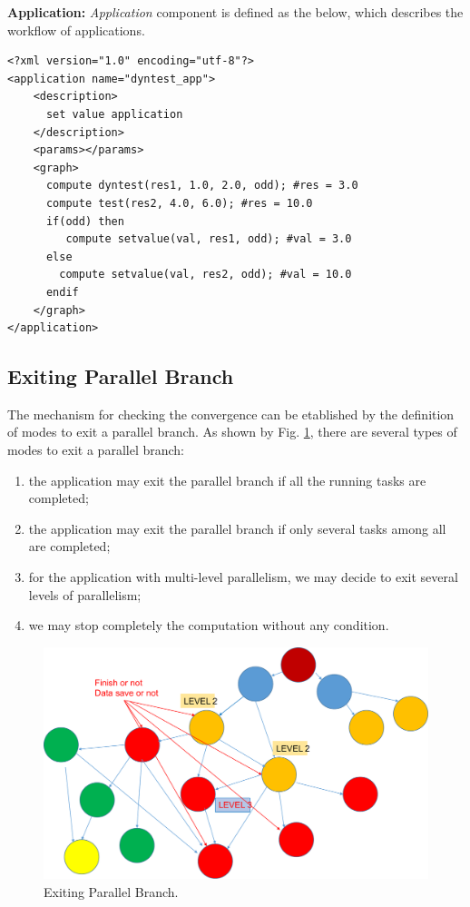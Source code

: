 \textbf{Application:} \textit{Application} component is defined as the below, which describes the workflow of applications.

\vspace{0.2in}
\lstset{language=XML}
\begin{lstlisting}[frame=single]
<?xml version="1.0" encoding="utf-8"?>
<application name="dyntest_app">
    <description>
      set value application
    </description>
    <params></params>
    <graph>
      compute dyntest(res1, 1.0, 2.0, odd); #res = 3.0
      compute test(res2, 4.0, 6.0); #res = 10.0
      if(odd) then
         compute setvalue(val, res1, odd); #val = 3.0
      else
        compute setvalue(val, res2, odd); #val = 10.0
      endif
    </graph>
</application>
\end{lstlisting}


\subsection{Exiting Parallel Branch}

The mechanism for checking the convergence can be etablished by the definition of modes to exit a parallel branch. As shown by Fig. \ref{fig:exit}, there are several types of modes to exit a parallel branch:

\begin{enumerate}
	\item the application may exit the parallel branch if all the running tasks are completed;
	\item the application may exit the parallel branch if only several tasks among all are completed;
	\item for the application with multi-level parallelism, we may decide to exit several levels of parallelism;
	\item we may stop completely the computation without any condition.
\end{enumerate}


\begin{figure}[t]
	\centering
	\includegraphics[width=5.in]{fig/exit-branch.pdf}
	\caption{Exiting Parallel Branch.}
	\label{fig:exit}
\end{figure}

